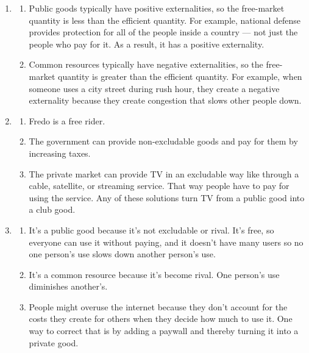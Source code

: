 \documentclass{article}
\begin{document}
\begin{enumerate}
\begin{enumerate}
	\end{enumerate}
	
\item 

	\begin{enumerate}
	
	\item Public goods typically have positive externalities, so the free-market quantity is less than the efficient quantity. For example, national defense provides protection for all of the people inside a country — not just the people who pay for it. As a result, it has a positive externality.
	
	\item Common resources typically have negative externalities, so the free-market quantity is greater than the efficient quantity. For example, when someone uses a city street during rush hour, they create a negative externality because they create congestion that slows other people down.
	
	\end{enumerate}
	
\item

	\begin{enumerate}
	
	\item Fredo is a free rider.
	
	\item The government can provide non-excludable goods and pay for them by increasing taxes.
	
	\item The private market can provide TV in an excludable way like through a cable, satellite, or streaming service. That way people have to pay for using the service. Any of these solutions turn TV from a public good into a club good.
	
	\end{enumerate}
	
\item

	\begin{enumerate}
	
	\item It’s a public good because it’s not excludable or rival. It’s free, so everyone can use it without paying, and it doesn’t have many users so no one person’s use slows down another person’s use.
	
	\item It’s a common resource because it’s become rival. One person’s use diminishes another’s.
	
	\item People might overuse the internet because they don’t account for the costs they create for others when they decide how much to use it. One way to correct that is by adding a paywall and thereby turning it into a private good.
	
	\end{enumerate}

\end{enumerate}
\end{document}
